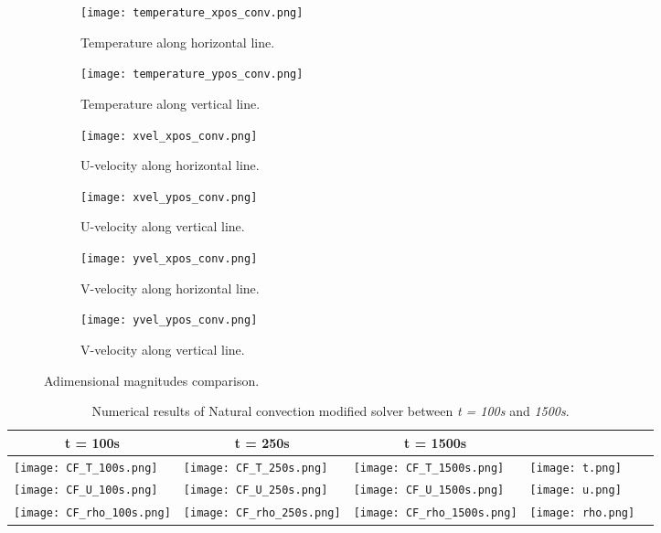 \clearpage
\begin{figure}[h!]
	\begin{subfigure}{0.50\textwidth}
		\centering
		\texttt{[image: temperature\_xpos\_conv.png]}\hfill
		\caption{Temperature along horizontal line.} \label{3.4afig}
	\end{subfigure}
	\hfill
	\begin{subfigure}{0.50\textwidth}
		\centering
		\texttt{[image: temperature\_ypos\_conv.png]}	
		\caption{Temperature along vertical line.}\label{3.4bfig}
	\end{subfigure}
	\begin{subfigure}{0.50\textwidth}
		\texttt{[image: xvel\_xpos\_conv.png]}\hfill
		\caption{U-velocity along horizontal line.}\label{3.4cfig}
	\end{subfigure}
	\begin{subfigure}{0.50\textwidth}
	\texttt{[image: xvel\_ypos\_conv.png]}	
	\caption{U-velocity along vertical line.}\label{3.4dfig}
	\end{subfigure}
	\begin{subfigure}{0.50\textwidth}
	\texttt{[image: yvel\_xpos\_conv.png]}\hfill	
	\caption{V-velocity along horizontal line.}\label{3.4efig}
	\end{subfigure}
	\begin{subfigure}{0.50\textwidth}
	\texttt{[image: yvel\_ypos\_conv.png]}	
	\caption{V-velocity along vertical line.}\label{3.4ffig}
	\end{subfigure}
	\caption{Adimensional magnitudes comparison.}
	\label{3.4fig}
\end{figure} 
\begin{table}[h!]
	\begin{tabular}{@{}lllll@{}}
		\toprule[1pt]
		\multicolumn{1}{c}{\textbf{t = 100s}} & \multicolumn{1}{c}{\textbf{t = 250s}} & \multicolumn{1}{c}{\textbf{t = 1500s}} \\ \midrule[2pt] 
		\texttt{[image: CF\_T\_100s.png]} & \texttt{[image: CF\_T\_250s.png]} & \texttt{[image: CF\_T\_1500s.png]} & \texttt{[image: t.png]} \\
		\texttt{[image: CF\_U\_100s.png]} & \texttt{[image: CF\_U\_250s.png]} & \texttt{[image: CF\_U\_1500s.png]} & \texttt{[image: u.png]} \\
		\texttt{[image: CF\_rho\_100s.png]} & \texttt{[image: CF\_rho\_250s.png]} & \texttt{[image: CF\_rho\_1500s.png]} & \texttt{[image: rho.png]} \\ \bottomrule[1pt]		
	\end{tabular}
	\centering
	\caption{Numerical results of Natural convection modified solver between \textit{t = 100s} and \textit{1500s}.}	
	\label{fig:resultsNCMF}
\end{table}

